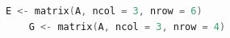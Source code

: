 \begin{lstlisting}[language=c++,label={code:09_02},caption={ベクトルデータの保持}]
    E <- matrix(A, ncol = 3, nrow = 6)
    G <- matrix(A, ncol = 3, nrow = 4)
\end{lstlisting}
